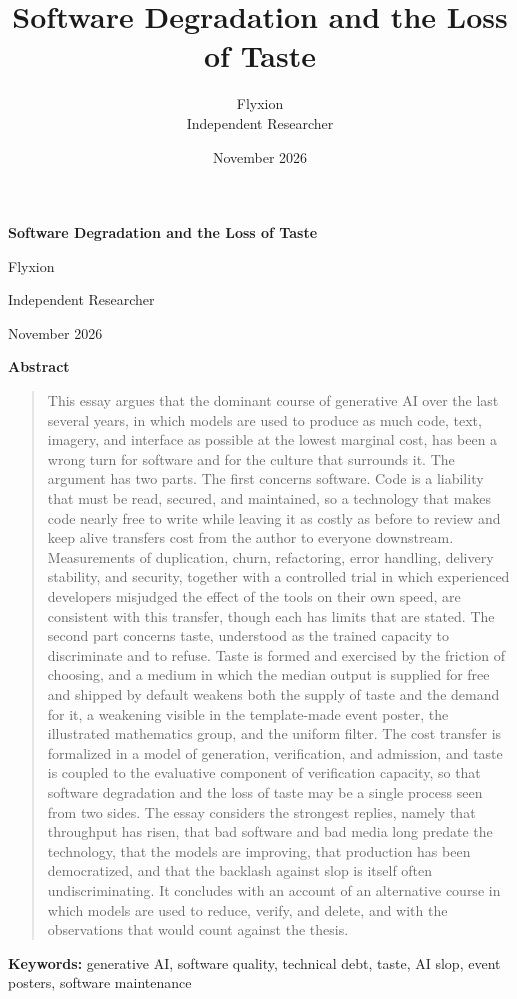 \documentclass[11pt,a4paper]{article}
\title{Software Degradation and the Loss of Taste}
\author{Flyxion\\[0.3em]\normalsize Independent Researcher}
\date{November 2026}
\theoremstyle{remark}
\begin{document}
\thispagestyle{empty}
\begin{center}
{\LARGE\bfseries Software Degradation and the Loss of Taste\par}
\vspace{1.4em}
{\large Flyxion\par}
{\normalsize Independent Researcher\par}
\vspace{0.3em}
{\normalsize November 2026\par}
\end{center}
\vspace{1.6em}
\begin{center}\textbf{Abstract}\end{center}
\begin{quotation}\small
\noindent This essay argues that the dominant course of generative AI over the last several years, in which models are used to produce as much code, text, imagery, and interface as possible at the lowest marginal cost, has been a wrong turn for software and for the culture that surrounds it. The argument has two parts. The first concerns software. Code is a liability that must be read, secured, and maintained, so a technology that makes code nearly free to write while leaving it as costly as before to review and keep alive transfers cost from the author to everyone downstream. Measurements of duplication, churn, refactoring, error handling, delivery stability, and security, together with a controlled trial in which experienced developers misjudged the effect of the tools on their own speed, are consistent with this transfer, though each has limits that are stated. The second part concerns taste, understood as the trained capacity to discriminate and to refuse. Taste is formed and exercised by the friction of choosing, and a medium in which the median output is supplied for free and shipped by default weakens both the supply of taste and the demand for it, a weakening visible in the template-made event poster, the illustrated mathematics group, and the uniform filter. The cost transfer is formalized in a model of generation, verification, and admission, and taste is coupled to the evaluative component of verification capacity, so that software degradation and the loss of taste may be a single process seen from two sides. The essay considers the strongest replies, namely that throughput has risen, that bad software and bad media long predate the technology, that the models are improving, that production has been democratized, and that the backlash against slop is itself often undiscriminating. It concludes with an account of an alternative course in which models are used to reduce, verify, and delete, and with the observations that would count against the thesis.
\end{quotation}
\vspace{1em}
\noindent\textbf{Keywords:} generative AI, software quality, technical debt, taste, AI slop, event posters, software maintenance
\clearpage
\end{document}
